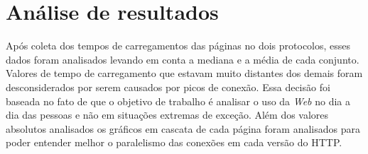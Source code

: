\section{Análise de resultados}
\label{sec:analisederesultados}

Após coleta dos tempos de carregamentos das páginas no dois protocolos, esses dados foram analisados levando em conta a mediana e a média de cada conjunto. Valores de tempo de carregamento que estavam muito distantes dos demais foram desconsiderados por serem causados por picos de conexão. Essa decisão foi baseada no fato de que o objetivo de trabalho é analisar o uso da \textit{Web} no dia a dia das pessoas e não em situações extremas  de exceção. Além dos valores absolutos analisados os gráficos em cascata de cada página foram analisados para poder entender melhor o paralelismo das conexões em cada versão do HTTP.